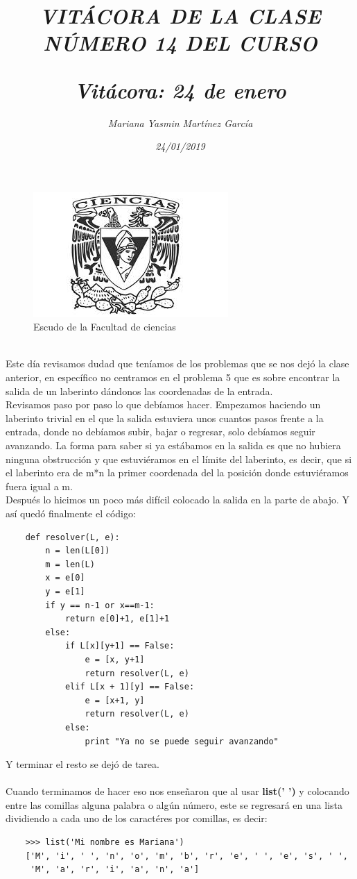\documentclass{article}
\title{\Huge\item\color{purple}\textit{VITÁCORA DE LA CLASE NÚMERO 14 DEL CURSO}}
\author{\Large\textit{ Mariana Yasmin Martínez García}}
\date{\Large\textit{ 24/01/2019}}
\begin{document}
\begin{figure}[t]
	\centering
	\includegraphics[width=0.8\linewidth]{Imagenes/1}
	\caption{Escudo de la Facultad de ciencias}
	\label{fig:1}
\end{figure}
	\maketitle
		
	\newpage
	
	\title{\Huge\textbf{\color{purple}\textit{Vitácora: 24 de enero\\}}} \\
	Este día revisamos dudad que teníamos de los problemas que se nos dejó la clase anterior, en específico no centramos en el problema 5 que es sobre encontrar la salida de un laberinto dándonos las coordenadas de la entrada. \\
	Revisamos paso por paso lo que debíamos hacer. Empezamos haciendo un laberinto trivial en el que la salida estuviera unos cuantos pasos frente a la entrada, donde no debíamos subir, bajar o regresar, solo debíamos seguir avanzando. La forma para saber si ya estábamos en la salida es que no hubiera ninguna obstrucción y que estuviéramos en el límite del laberinto, es decir, que si el laberinto era de m*n la primer coordenada del la posición donde estuviéramos fuera igual a m. \\
	Después lo hicimos un poco más difícil colocado la salida en la parte de abajo. Y así quedó finalmente el código:  \\
	\begin{verbatim}
	def resolver(L, e):
		n = len(L[0]) 
		m = len(L)
		x = e[0]
		y = e[1]
		if y == n-1 or x==m-1:
			return e[0]+1, e[1]+1 
		else:
			if L[x][y+1] == False:
				e = [x, y+1]
				return resolver(L, e) 
			elif L[x + 1][y] == False:
				e = [x+1, y]
				return resolver(L, e) 
			else:
				print "Ya no se puede seguir avanzando"
	\end{verbatim}
	Y terminar el resto se dejó de tarea. \\ \\
	Cuando terminamos de hacer eso nos enseñaron que al usar \textbf{list(' ')} y colocando entre las comillas alguna palabra o algún número, este se regresará en una lista dividiendo a cada uno de los caractéres por comillas, es decir:
	\begin{verbatim}
	>>> list('Mi nombre es Mariana')
	['M', 'i', ' ', 'n', 'o', 'm', 'b', 'r', 'e', ' ', 'e', 's', ' ',
	 'M', 'a', 'r', 'i', 'a', 'n', 'a']
	\end{verbatim}
	  
\end{document}
